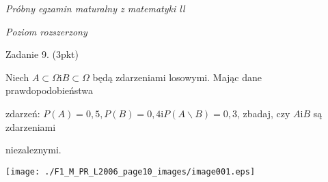 \documentclass[a4paper,12pt]{article}
\begin{document}
{\it Próbny egzamin maturalny z matematyki ll}

{\it Poziom rozszerzony}

Zadanie 9. (3pkt)

Niech $ A\subset\Omega \mathrm{i}  B\subset\Omega$ będą zdarzeniami losowymi. Mając dane prawdopodobieństwa

zdarzeń: $P(A)=0,5, P(B)=0,4 \mathrm{i} P(A\backslash B)=0,3$, zbadaj, czy $A \mathrm{i} B$ są zdarzeniami

niezaleznymi.
\begin{center}
\texttt{[image: ./F1\_M\_PR\_L2006\_page10\_images/image001.eps]}
\end{center}
\end{document}

